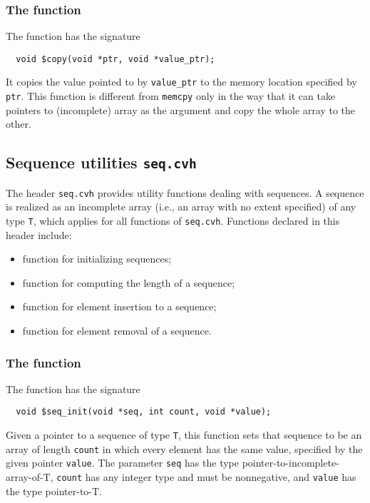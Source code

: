 \subsubsection{The \ccopy{} function}

The \ccopy{} function has the signature
\begin{verbatim}
  void $copy(void *ptr, void *value_ptr);
\end{verbatim}

It copies the value pointed to by \texttt{value\_ptr} to the memory 
location specified by \texttt{ptr}. This function is different from \texttt{memcpy} only in the way that
it can take pointers to (incomplete) array as the argument and copy the whole array to the other.

\subsection{Sequence utilities \texttt{seq.cvh}}
\label{subsec:seqLibrary}
The header \texttt{seq.cvh} provides utility functions dealing with sequences. A sequence is realized as an incomplete array (i.e., an array with no extent specified) of any type \texttt{T}, which applies for all functions of \texttt{seq.cvh}. Functions declared in this header include:
\begin{itemize}
\item function \cseqinit{} for initializing sequences;
\item function \cseqlen{} for computing the length of a sequence;
\item function \cseqinsert{} for element insertion to a sequence;
\item function \cseqrm{} for element removal of a sequence.
\end{itemize}

\subsubsection{The \cseqinit{} function}

The \cseqinit{} function has the signature
\begin{verbatim}
  void $seq_init(void *seq, int count, void *value);
\end{verbatim}

Given a pointer to a sequence of type \texttt{T}, this function sets that sequence to be an array of length \texttt{count} in which every element has the same value, specified by the given pointer \texttt{value}. The parameter \texttt{seq} has the type pointer-to-incomplete-array-of-T, \texttt{count} has any integer type and must be nonnegative, and \texttt{value} has the type pointer-to-T.

